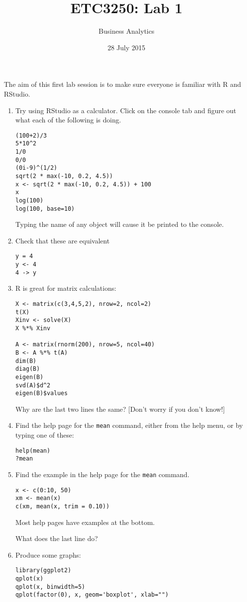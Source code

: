 \documentclass[11pt]{article}
\title{ETC3250: Lab 1}
\author{Business Analytics}
\date{28 July 2015}
\begin{document}
\maketitle

The aim of this first lab session is to make sure everyone is familiar with R and RStudio.


\begin{enumerate}
\item Try using RStudio as a calculator. Click on the console tab and figure out what each of the following is doing.
\begin{verbatim}
(100+2)/3
5*10^2 
1/0
0/0
(0i-9)^(1/2)
sqrt(2 * max(-10, 0.2, 4.5)) 
x <- sqrt(2 * max(-10, 0.2, 4.5)) + 100
x
log(100)
log(100, base=10) 
\end{verbatim}
Typing the name of any object will cause it be printed to the console.

\item Check that these are equivalent
\begin{verbatim}
y = 4
y <- 4
4 -> y
\end{verbatim}

\item R is great for matrix calculations:
\begin{verbatim}
X <- matrix(c(3,4,5,2), nrow=2, ncol=2)
t(X)
Xinv <- solve(X)
X %*% Xinv

A <- matrix(rnorm(200), nrow=5, ncol=40)
B <- A %*% t(A)
dim(B)
diag(B)
eigen(B)
svd(A)$d^2
eigen(B)$values
\end{verbatim}
Why are the last two lines the same? [Don't worry if you don't know!]

\item Find the help page for the \verb|mean| command, either from the help menu, or by typing one of these:
\begin{verbatim}
help(mean)
?mean 
\end{verbatim}

\item Find the example in the help page for the \verb|mean| command.
\begin{verbatim}
x <- c(0:10, 50) 
xm <- mean(x)
c(xm, mean(x, trim = 0.10))
\end{verbatim}
Most help pages have examples at the bottom.

What does the last line do?


\item Produce some graphs:
\begin{verbatim}
library(ggplot2)
qplot(x)
qplot(x, binwidth=5)
qplot(factor(0), x, geom='boxplot', xlab="")
\end{verbatim}


\end{enumerate}
\end{document}
